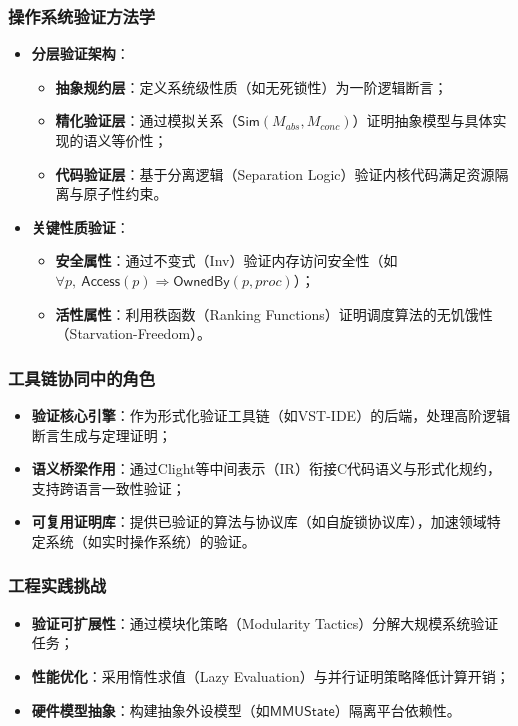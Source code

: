 \subsubsection{操作系统验证方法学}
\begin{itemize}
    \item \textbf{分层验证架构}：
    \begin{itemize}
        \item \textbf{抽象规约层}：定义系统级性质（如无死锁性）为一阶逻辑断言；
        \item \textbf{精化验证层}：通过模拟关系（$\mathsf{Sim}(M_{abs}, M_{conc})$）证明抽象模型与具体实现的语义等价性；
        \item \textbf{代码验证层}：基于分离逻辑（Separation Logic）验证内核代码满足资源隔离与原子性约束。
    \end{itemize}
    
    \item \textbf{关键性质验证}：
    \begin{itemize}
        \item \textbf{安全属性}：通过不变式（Inv）验证内存访问安全性（如%
        $\forall p,\>\mathsf{Access}(p) \mathrel{\Rightarrow} \mathsf{OwnedBy}(p, \mathit{proc})$）；
        \item \textbf{活性属性}：利用秩函数（Ranking Functions）证明调度算法的无饥饿性（Starvation-Freedom）。
    \end{itemize}
\end{itemize}

\subsubsection{工具链协同中的角色}
\begin{itemize}
    \item \textbf{验证核心引擎}：作为形式化验证工具链（如VST-IDE）的后端，处理高阶逻辑断言生成与定理证明；
    \item \textbf{语义桥梁作用}：通过Clight等中间表示（IR）衔接C代码语义与形式化规约，支持跨语言一致性验证；
    \item \textbf{可复用证明库}：提供已验证的算法与协议库（如自旋锁协议库），加速领域特定系统（如实时操作系统）的验证。
\end{itemize}

\subsubsection{工程实践挑战}
\begin{itemize}
    \item \textbf{验证可扩展性}：通过模块化策略（Modularity Tactics）分解大规模系统验证任务；
    \item \textbf{性能优化}：采用惰性求值（Lazy Evaluation）与并行证明策略降低计算开销；
    \item \textbf{硬件模型抽象}：构建抽象外设模型（如$\mathsf{MMUState}$）隔离平台依赖性。
\end{itemize}

